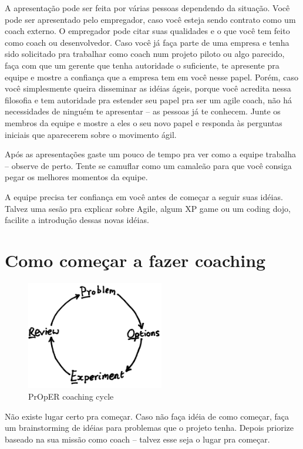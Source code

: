\documentclass[a4paper, 10pt, font=plain]{abnt}
\begin{document}
A apresentação pode ser feita por várias pessoas dependendo da situação. Você pode ser apresentado pelo empregador, caso você esteja sendo contrato como um coach externo. O empregador pode citar suas qualidades e o que você tem feito como coach ou desenvolvedor.
Caso você já faça parte de uma empresa e tenha sido solicitado pra trabalhar como coach num projeto piloto ou algo parecido, faça com que um gerente que tenha autoridade o suficiente, te apresente pra equipe e mostre a confiança que a empresa tem em você nesse papel. Porém, caso você simplesmente queira disseminar as idéias ágeis, porque você acredita nessa filosofia e tem autoridade pra estender seu papel pra ser um agile coach, não há necessidades de ninguém te apresentar -- as pessoas já te conhecem. Junte os membros da equipe e mostre a eles o seu novo papel e responda às perguntas iniciais que aparecerem sobre o movimento ágil.

Após as apresentações gaste um pouco de tempo pra ver como a equipe trabalha -- observe de perto. Tente se camuflar como um camaleão para que você consiga pegar os melhores momentos da equipe.

A equipe precisa ter confiança em você antes de começar a seguir suas idéias. Talvez uma sesão pra explicar sobre Agile, algum XP game ou um coding dojo, facilite a introdução dessas novas idéias.



\section{Como começar a fazer coaching}
    \begin{figure}[h]
        \centering
        \includegraphics[width=6cm]{PrOpER.png}
        \caption{PrOpER coaching cycle}
    \end{figure}

Não existe lugar certo pra começar. Caso não faça idéia de como começar, faça um brainstorming de idéias para problemas que o projeto tenha. Depois priorize baseado na sua missão como coach -- talvez esse seja o lugar pra começar.
\end{document}
